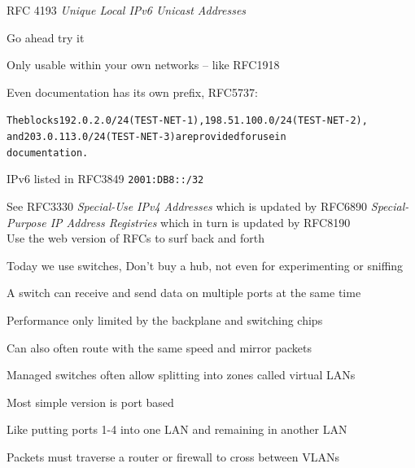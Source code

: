 \documentclass[Screen16to9,17pt]{foils}
\begin{document}
\begin{list2}
\item RFC 4193 \emph{Unique Local IPv6 Unicast Addresses}
\item Go ahead try it
\item Only usable within your own networks -- like RFC1918
\end{list2}




Even documentation has its own prefix, RFC5737:
\begin{alltt}
The blocks 192.0.2.0/24 (TEST-NET-1), 198.51.100.0/24 (TEST-NET-2),
and 203.0.113.0/24 (TEST-NET-3) are provided for use in
documentation.
\end{alltt}

IPv6 listed in RFC3849 \verb+2001:DB8::/32+

See RFC3330 \emph{Special-Use IPv4 Addresses} which is updated by
RFC6890 \emph{Special-Purpose IP Address Registries} which in turn is updated by RFC8190\\
Use the web version of RFCs to surf back and forth 




\begin{list1}
\item Today we use switches, Don't buy a hub, not even for experimenting or sniffing
\item A switch can receive and send data on multiple ports at the same time
\item Performance only limited by the backplane and switching chips
\item Can also often route with the same speed and mirror packets
\end{list1}



\begin{list1}
\item Managed switches often allow splitting into zones called virtual LANs
\item Most simple version is port based
\item Like putting ports 1-4 into one LAN and remaining in another LAN
\item Packets must traverse a router or firewall to cross between VLANs
\end{list1}
\end{document}
